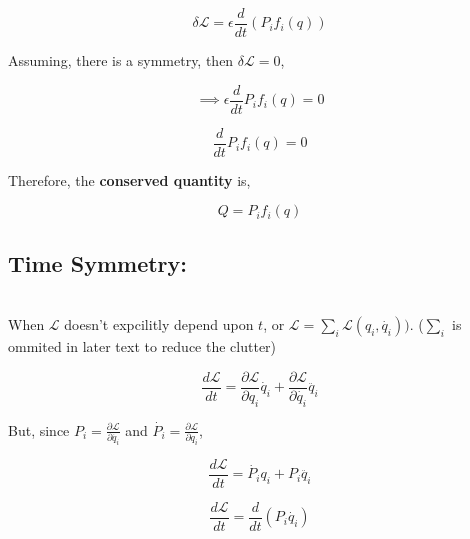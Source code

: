 \documentclass[a4paper]{article}
\newcommand{\Lagr}{\mathcal{L}}
\newcommand{\ddt}{\frac{d}{dt}}
\newcommand{\ddtf}[1]{\frac{d #1}{dt}}
\newcommand{\pdt}[2]{\frac{\partial #1}{\partial #2}}
\begin{document}
			$$ \delta \Lagr = \epsilon \ddt(P_i f_i(q)) $$
			
			Assuming, there is a symmetry, then $\delta \Lagr = 0$,

			$$\implies \epsilon \ddt{P_i f_i(q)} = 0$$

			$$ \ddt{P_i f_i(q)} = 0 $$

			Therefore, the \textbf{conserved quantity} is,

			\begin{equation}
				Q = P_i f_i(q) \label{eq_conserved_Q}
			\end{equation}
		
		\subsection*{Time Symmetry: }
			\noindent \\









			When $\Lagr$ doesn't expcilitly depend upon $t$, or $\Lagr = \sum_i \Lagr(q_i, \dot{q_i}))$. ($\sum_i$ is ommited in later text to reduce the clutter)

			$$ \ddtf{\Lagr} = \pdt{\Lagr}{q_i}\dot{q_i} + \pdt{\Lagr}{\dot{q_i}} \ddot{q_i} $$

			But, since $ P_i = \pdt{\Lagr}{\dot{q_i}} $ and $ \dot{P_i} = \pdt{\Lagr}{q_i} $,

			$$ \ddtf{\Lagr} = \dot{P_i} q_i + P_i \ddot{q_i} $$

			$$ \ddtf{\Lagr} = \ddt(P_i \dot{q_i}) $$
\end{document}
